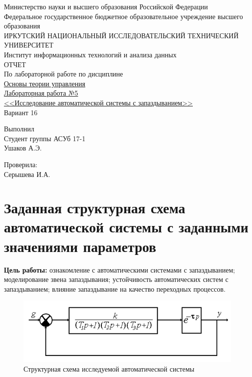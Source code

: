 \documentclass[12pt]{article}
\begin{document}
\begin{titlepage}
\begin{center}
Министерство науки и высшего образования Российской Федерации\\
Федеральное государственное бюджетное образовательное учреждение высшего образования\\
ИРКУТСКИЙ НАЦИОНАЛЬНЫЙ ИССЛЕДОВАТЕЛЬСКИЙ ТЕХНИЧЕСКИЙ УНИВЕРСИТЕТ\\
Институт информационных технологий и анализа данных\\
\vspace{7cm}
\large ОТЧЕТ\\
По лабораторной работе по дисциплине\\
\underline{Основы теории управления}\\
\underline{Лабораторная работа №5}\\
\underline{<<Исследование автоматической системы с запаздыванием>>}\\
Вариант 16
\end{center}
\vspace{9cm}
\begin{flushright}
Выполнил \\
Студент группы АСУб 17-1 \\
Ушаков А.Э. \\
\end{flushright}
\begin{flushright}
Проверила:\\
Серышева И.А. \\
\end{flushright}
\end{titlepage}
\section{Заданная структурная схема автоматической системы с заданными значениями параметров}
\textbf{Цель работы: } ознакомление с автоматическими системами с запаздыванием; моделирование звена запаздывания; устойчивость автоматических систем с запаздыванием; влияние запаздывание на качество переходных процессов. \\
\begin{figure}[h]
    \label{graphs}
     \centering
    \includegraphics[width = 12cm]{структурная схема.png}
    \caption{Структурная схема исследуемой автоматической системы}
\end{figure}
 
\end{document}
